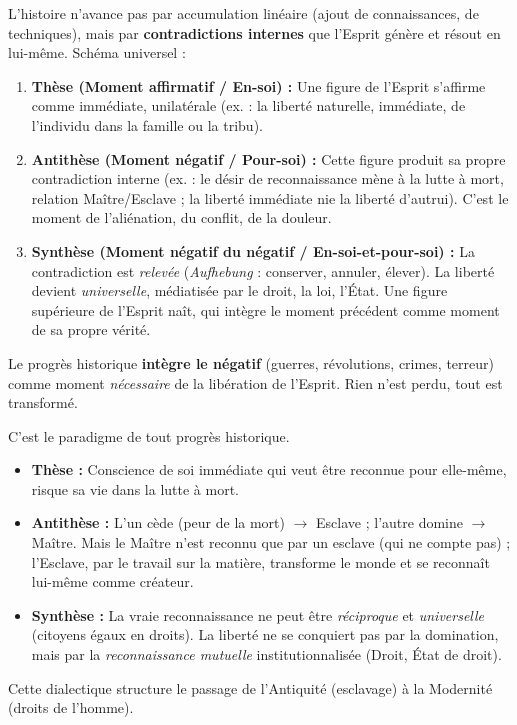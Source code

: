 \documentclass[11pt]{article}
\begin{document}
\begin{propriete}
L'histoire n'avance pas par accumulation linéaire (ajout de connaissances, de techniques), mais par \textbf{contradictions internes} que l'Esprit génère et résout en lui-même. Schéma universel :
\begin{enumerate}
    \item \textbf{Thèse (Moment affirmatif / En-soi) :} Une figure de l'Esprit s'affirme comme immédiate, unilatérale (ex. : la liberté naturelle, immédiate, de l'individu dans la famille ou la tribu).
    \item \textbf{Antithèse (Moment négatif / Pour-soi) :} Cette figure produit sa propre contradiction interne (ex. : le désir de reconnaissance mène à la lutte à mort, relation Maître/Esclave ; la liberté immédiate nie la liberté d'autrui). C'est le moment de l'aliénation, du conflit, de la douleur.
    \item \textbf{Synthèse (Moment négatif du négatif / En-soi-et-pour-soi) :} La contradiction est \emph{relevée} (\emph{Aufhebung} : conserver, annuler, élever). La liberté devient \emph{universelle}, médiatisée par le droit, la loi, l'État. Une figure supérieure de l'Esprit naît, qui intègre le moment précédent comme moment de sa propre vérité.
\end{enumerate}
Le progrès historique \textbf{intègre le négatif} (guerres, révolutions, crimes, terreur) comme moment \emph{nécessaire} de la libération de l'Esprit. Rien n'est perdu, tout est transformé.
\end{propriete}

\begin{exemplebox}
C'est le paradigme de tout progrès historique.
\begin{itemize}
    \item \textbf{Thèse :} Conscience de soi immédiate qui veut être reconnue pour elle-même, risque sa vie dans la lutte à mort.
    \item \textbf{Antithèse :} L'un cède (peur de la mort) $\to$ Esclave ; l'autre domine $\to$ Maître. Mais le Maître n'est reconnu que par un esclave (qui ne compte pas) ; l'Esclave, par le travail sur la matière, transforme le monde et se reconnaît lui-même comme créateur.
    \item \textbf{Synthèse :} La vraie reconnaissance ne peut être \emph{réciproque} et \emph{universelle} (citoyens égaux en droits). La liberté ne se conquiert pas par la domination, mais par la \emph{reconnaissance mutuelle} institutionnalisée (Droit, État de droit).
\end{itemize}
Cette dialectique structure le passage de l'Antiquité (esclavage) à la Modernité (droits de l'homme).
\end{exemplebox}
\end{document}
